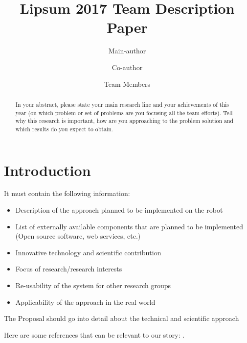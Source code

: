 \documentclass[runningheads,a4paper]{llncs}
\begin{document}
\title{Lipsum 2017 Team Description Paper}

\author{Main-author \and Co-author \and Team Members }
\maketitle



\begin{abstract}

In your abstract, please state your main research line and your achievements of this year (on which problem or set of problems are you focusing all the team efforts). Tell why this research is important, how are you approaching to the problem solution and which results do you expect to obtain.

\end{abstract}



\section{Introduction}


It must contain the following information:
\begin{itemize}
    \item Description of the approach planned to be implemented on the robot
    \item List of externally available components that are planned to be implemented (Open source software, web services, etc.)
    \item Innovative technology and scientific contribution
    \item Focus of research/research interests
    \item Re-usability of the system for other research groups
    \item Applicability of the approach in the real world
\end{itemize}
The Proposal should go into detail about the technical and scientific approach


Here are some references that can be relevant to our story:
\cite{havoutis13ijrr,Winkler2015,havoutis15clawar,Mastalli2015,Havoutis16SSRR,Zeestraten2017-RAL,Havoutis17ICRA,Zeestraten17IROS,Mastalli17ICRA}.
 



\end{document}
